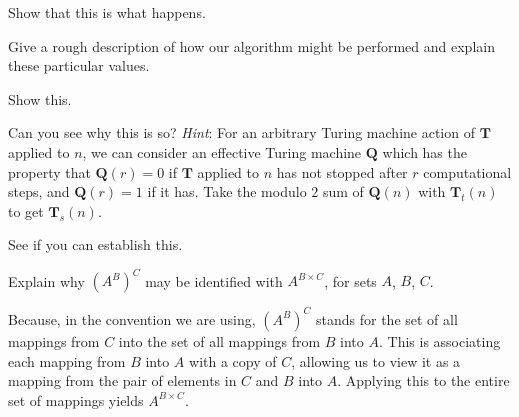 \documentclass[../the-road-to-reality.tex]{subfiles}
\begin{document}
\begin{questions}
	\question Show that this is what happens.

	\question Give a rough description of how our algorithm might be performed and explain these particular values.

	\question Show this.

	\question Can you see why this is so? \textit{Hint}: For an arbitrary Turing machine action of $\mathbf{T}$ applied to $n$, we can consider an effective Turing machine $\mathbf{Q}$ which has the property that $\mathbf{Q}(r)=0$ if $\mathbf{T}$ applied to $n$ has not stopped after $r$ computational steps, and $\mathbf{Q}(r)=1$ if it has. Take the modulo $2$ sum of $\mathbf{Q}(n)$ with $\mathbf{T}_t(n)$ to get $\mathbf{T}_s(n)$.

	\question See if you can establish this.

	\question Explain why $(A^B)^C$ may be identified with $A^{B\times{C}}$, for sets $A$, $B$, $C$.

	\begin{solution}
		Because, in the convention we are using, $(A^B)^C$ stands for the set of all mappings from $C$ into the set of all mappings from $B$ into $A$. This is associating each mapping from $B$ into $A$ with a copy of $C$, allowing us to view it as a mapping from the pair of elements in $C$ and $B$ into $A$. Applying this to the entire set of mappings yields $A^{B\times{C}}$.
	\end{solution}

\end{questions}
\end{document}

